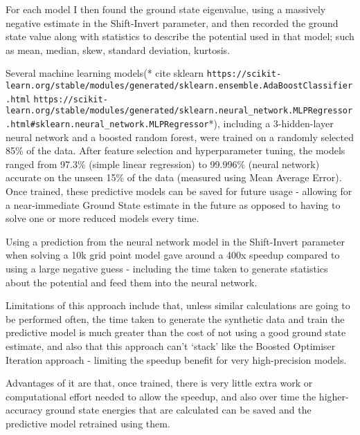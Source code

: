 For each model I then found the ground state eigenvalue, using a massively negative estimate in the Shift-Invert parameter, and then recorded the ground state value along with statistics to describe the potential used in that model; such as mean, median, skew, standard deviation, kurtosis. 

Several machine learning models(* cite sklearn \texttt{https://scikit-learn.org/stable/modules/generated/sklearn.ensemble.AdaBoostClassifier.html} \texttt{https://scikit-learn.org/stable/modules/generated/sklearn.neural\_network.MLPRegressor.html#sklearn.neural\_network.MLPRegressor}*), including a 3-hidden-layer neural network and a boosted random forest, were trained on a randomly selected 85\% of the data. After feature selection and hyperparameter tuning, the models ranged from 97.3\% (simple linear regression) to 99.996\% (neural network) accurate on the unseen 15\% of the data (measured using Mean Average Error).
Once trained, these predictive models can be saved for future usage - allowing for a near-immediate Ground State estimate in the future as opposed to having to solve one or more reduced models every time. 

Using a prediction from the neural network model in the Shift-Invert parameter when solving a 10k grid point model gave around a 400x speedup compared to using a large negative guess - including the time taken to generate statistics about the potential and feed them into the neural network. 

Limitations of this approach include that, unless similar calculations are going to be performed often, the time taken to generate the synthetic data and train the predictive model is much greater than the cost of not using a good ground state estimate, and also that this approach can't `stack' like the Boosted Optimiser Iteration approach - limiting the speedup benefit for very high-precision models. 

Advantages of it are that, once trained, there is very little extra work or computational effort needed to allow the speedup, and also over time the higher-accuracy ground state energies that are calculated can be saved and the predictive model retrained using them.


